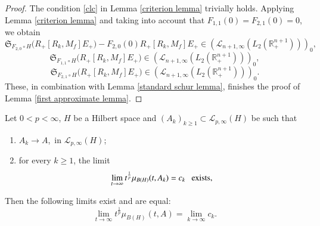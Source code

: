 \documentclass[12pt]{amsart}
\begin{document}
\begin{proof}
The condition \eqref{clc} in Lemma \ref{criterion lemma} trivially holds. Applying Lemma \ref{criterion lemma}
and taking into account that $F_{1,1}(0)=F_{2,1}(0)=0$, we obtain
$$\mathfrak{S}_{F_{2,0}\circ H}\Big(R_+[R_k,M_f]E_+\Big)-F_{2,0}(0) R_+[R_k,M_f]E_+\in (\mathcal{L}_{n+1,\infty}(L_2(\mathbb{R}^{n+1}_+)))_0,$$
$$\mathfrak{S}_{F_{1,1}\circ H}\Big(  R_+[R_k,M_f]E_+\Big)\in (\mathcal{L}_{n+1,\infty}(L_2(\mathbb{R}^{n+1}_+)))_0,$$
$$\mathfrak{S}_{F_{2,1}\circ H}\Big(  R_+[R_k,M_f]E_+\Big)\in (\mathcal{L}_{n+1,\infty}(L_2(\mathbb{R}^{n+1}_+)))_0.$$
These, in combination with Lemma \ref{standard schur lemma}, finishes the proof of Lemma \ref{first approximate lemma}.
\end{proof}

\begin{lemma}\label{approlem}
Let $0<p<\infty$, $H$ be a Hilbert space and $(A_k)_{k\geq 1}\subset \mathcal{L}_{p,\infty}(H)$ be such that
\begin{enumerate}
  \item $A_k\rightarrow A$,\, in $\mathcal{L}_{p,\infty}(H)$;
  \item for every $k\geq 1$, the limit
  $$\lim_{t\rightarrow \infty}t^{\frac{1}{p}}\mu_{B(H)}(t,A_k)=c_k \ \ \ {\rm exists},$$
\end{enumerate}
Then the following limits exist and are equal:
$$\lim_{t\rightarrow \infty}t^{\frac{1}{p}}\mu_{B(H)}(t,A)=\lim_{k\rightarrow \infty}c_k.$$
\end{lemma}
\end{document}
